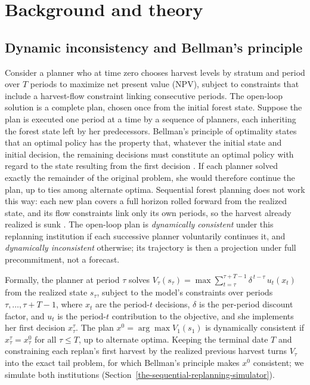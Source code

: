 \section{Background and theory}

\hypertarget{dynamic-inconsistency-and-bellmans-principle}{%
\subsection{Dynamic inconsistency and Bellman's principle}\label{dynamic-inconsistency-and-bellmans-principle}}

Consider a planner who at time zero chooses harvest levels by stratum and period over \(T\) periods to maximize net present value (NPV), subject to constraints that include a harvest-flow constraint linking consecutive periods. The open-loop solution is a complete plan, chosen once from the initial forest state. Suppose the plan is executed one period at a time by a sequence of planners, each inheriting the forest state left by her predecessors. Bellman's principle of optimality states that an optimal policy has the property that, whatever the initial state and initial decision, the remaining decisions must constitute an optimal policy with regard to the state resulting from the first decision \citep{bellman1957dynamic}. If each planner solved exactly the remainder of the original problem, she would therefore continue the plan, up to ties among alternate optima. Sequential forest planning does not work this way: each new plan covers a full horizon rolled forward from the realized state, and its flow constraints link only its own periods, so the harvest already realized is sunk \citep[pp.~41, 82]{daugherty1991credibility}. The open-loop plan is \emph{dynamically consistent} under this replanning institution if each successive planner voluntarily continues it, and \emph{dynamically inconsistent} otherwise; its trajectory is then a projection under full precommitment, not a forecast.

Formally, the planner at period \(\tau\) solves \(V_\tau(s_\tau) = \max \sum_{t=\tau}^{\tau+T-1} \delta^{\,t-\tau} \, u_t(x_t)\) from the realized state \(s_\tau\), subject to the model's constraints over periods \(\tau, \ldots, \tau+T-1\), where \(x_t\) are the period-\(t\) decisions, \(\delta\) is the per-period discount factor, and \(u_t\) is the period-\(t\) contribution to the objective, and she implements her first decision \(x_\tau^{\tau}\). The plan \(x^{0} = \arg\max V_1(s_1)\) is dynamically consistent if \(x_\tau^{\tau} = x_\tau^{0}\) for all \(\tau \leq T\), up to alternate optima. Keeping the terminal date \(T\) and constraining each replan's first harvest by the realized previous harvest turns \(V_\tau\) into the exact tail problem, for which Bellman's principle makes \(x^{0}\) consistent; we simulate both institutions (Section~\ref{the-sequential-replanning-simulator}).

